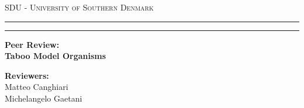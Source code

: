\documentclass[12pt,a4paper,oneside]{book}
\begin{document}
\pagestyle{empty}
\begin{titlepage}
\begin{center}
    {{\Large{\textsc{SDU - University of Southern Denmark}}}}
    \rule[0.1cm]{\textwidth}{0.1mm}
    \rule[0.5cm]{\textwidth}{0.6mm}
\end{center}

\vspace{45mm}

\begin{center}
    \large \textbf{Peer Review: \\ Taboo Model Organisms}
\end{center}

\vspace{60mm}
\par
\noindent

\vspace{30mm}

\begin{minipage}[t]{0.8\textwidth}
    {{\textbf{Reviewers:}\\
        Matteo Canghiari \\ Michelangelo Gaetani
    }}
\end{minipage}

\end{titlepage}

\restoregeometry

\pagestyle{empty}
\newpage~\newpage
\thispagestyle{empty}

\clearpage
{}
\pagestyle{plain}


\end{document}
